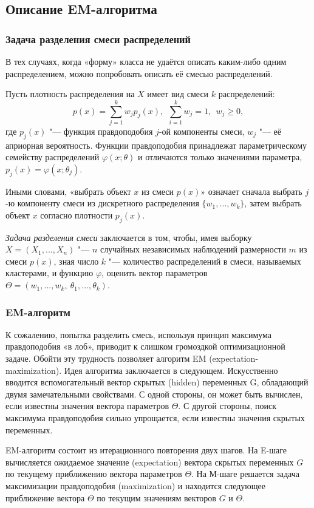 \subsection{Описание EM-алгоритма}
\subsubsection{Задача разделения смеси распределений}
В тех случаях, когда «форму» класса не удаётся описать каким-либо одним распределением, можно попробовать описать её смесью распределений.

Пусть плотность распределения на $X$ имеет вид смеси $k$ распределений:
$$p(x) = \sum_{j=1}^k w_j p_j(x), \ \ \sum_{i=1}^k w_j = 1, \ \ w_j \geq 0,$$ где $p_j(x)$ "--- функция правдоподобия $j$-ой компоненты смеси, $w_j$ "--- её априорная вероятность. Функции правдоподобия принадлежат параметрическому семейству распределений $\varphi (x; \theta)$ и отличаются только значениями параметра, $p_j(x) = \varphi(x; \theta_j)$.

Иными словами, «выбрать объект $x$ из смеси $p(x)$» означает сначала выбрать $j$-ю компоненту смеси из дискретного распределения $\{w_1, \dots , w_k\}$, затем выбрать объект $x$ согласно плотности $p_j(x)$.

\emph{Задача разделения смеси} заключается в том, чтобы, имея выборку $X = (X_1, ..., X_n)$ "--- $n$ случайных независимых наблюдений размерности $m$ из смеси $p(x)$, зная число $k$ "--- количество распределений в смеси, называемых кластерами, и функцию $\varphi$, оценить вектор параметров $\Theta = (w_1, ..., w_k,\ \theta_1, ..., \theta_k)$.

\subsubsection{EM-алгоритм}
    К сожалению, попытка разделить смесь, используя принцип максимума правдоподобия «в лоб», приводит к слишком громоздкой оптимизационной задаче. Обойти эту трудность позволяет алгоритм EM (expectation-maximization). Идея алгоритма заключается в следующем. Искусственно вводится вспомогательный вектор скрытых (hidden) переменных G, обладающий двумя замечательными свойствами. С одной стороны, он может быть вычислен, если известны значения вектора параметров $\Theta$. С другой стороны, поиск максимума правдоподобия сильно упрощается, если известны значения скрытых переменных.

    EM-алгоритм состоит из итерационного повторения двух шагов. На E-шаге вычисляется ожидаемое значение (expectation) вектора скрытых переменных $G$ по текущему приближению вектора параметров $\Theta$. На М-шаге решается задача максимизации правдоподобия (maximization) и находится следующее приближение вектора $\Theta$ по текущим значениям векторов $G$ и $\Theta$.

